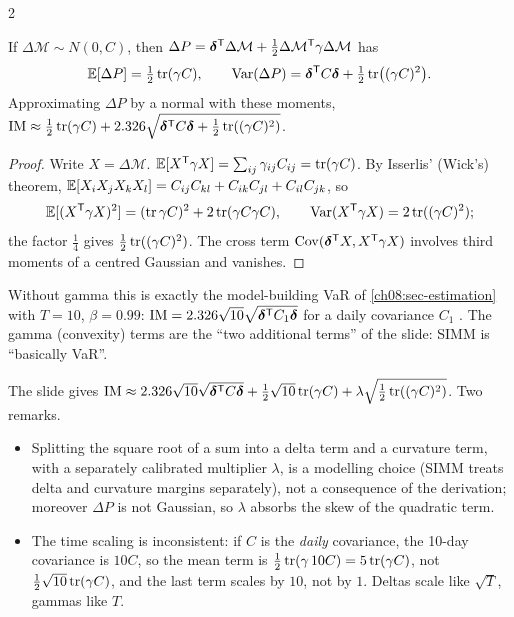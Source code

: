 \begin{paracol}{2}
\begin{proposition}\label{ch08:prop-simm}
If $\Delta\mathcal M\sim N(0,C)$, then $\Delta P=\bm\delta^{\mathsf T}\Delta\mathcal M+\frac12\Delta\mathcal M^{\mathsf T}\gamma\Delta\mathcal M$ has
\[
  \mathbb{E}[\Delta P]=\tfrac12\operatorname{tr}(\gamma C),\qquad \operatorname{Var}(\Delta P)=\bm\delta^{\mathsf T} C\bm\delta+\tfrac12\operatorname{tr}\bigl((\gamma C)^2\bigr).
\]
Approximating $\Delta P$ by a normal with these moments,
$\mathrm{IM}\approx\frac12\operatorname{tr}(\gamma C)+2.326\sqrt{\bm\delta^{\mathsf T} C\bm\delta+\frac12\operatorname{tr}((\gamma C)^2)}$.
\end{proposition}
\begin{proof}
Write $X=\Delta\mathcal M$. $\mathbb{E}[X^{\mathsf T}\gamma X]=\sum_{ij}\gamma_{ij}C_{ij}=\operatorname{tr}(\gamma C)$. By Isserlis' (Wick's) theorem,
$\mathbb{E}[X_iX_jX_kX_l]=C_{ij}C_{kl}+C_{ik}C_{jl}+C_{il}C_{jk}$, so
\[\mathbb{E}[(X^{\mathsf T}\gamma X)^2]=(\operatorname{tr}\gamma C)^2+2\operatorname{tr}(\gamma C\gamma C),\qquad \operatorname{Var}(X^{\mathsf T}\gamma X)=2\operatorname{tr}((\gamma C)^2);\]
the factor
$\frac14$ gives $\frac12\operatorname{tr}((\gamma C)^2)$. The cross term $\operatorname{Cov}(\bm\delta^{\mathsf T} X,X^{\mathsf T}\gamma X)$ involves third moments of a
centred Gaussian and vanishes.
\end{proof}
Without gamma this is exactly the model-building VaR of \cref{ch08:sec-estimation} with $T=10$, $\beta=0.99$:
$\mathrm{IM}=2.326\sqrt{10}\sqrt{\bm\delta^{\mathsf T} C_1\bm\delta}$ for a daily covariance $C_1$ . The
gamma (convexity) terms are the ``two additional terms'' of the slide: SIMM is ``basically VaR''.

\begin{coursenote}
The slide gives $\mathrm{IM}\approx2.326\sqrt{10}\sqrt{\bm\delta^{\mathsf T} C\bm\delta}+\frac12\sqrt{10}\operatorname{tr}(\gamma C)
+\lambda\sqrt{\frac12\operatorname{tr}((\gamma C)^2)}$. Two remarks.
\begin{itemize}
  \item Splitting the square root of a sum into a delta term and a
      curvature term, with a separately calibrated multiplier $\lambda$, is a modelling choice (SIMM treats delta and
      curvature margins separately), not a consequence of the derivation; moreover $\Delta P$ is not Gaussian, so
      $\lambda$ absorbs the skew of the quadratic term.
  \item The time scaling is inconsistent: if $C$ is the \emph{daily}
      covariance, the 10-day covariance is $10C$, so the mean term is $\frac12\operatorname{tr}(\gamma\,10C)=5\operatorname{tr}(\gamma C)$, not
      $\frac12\sqrt{10}\operatorname{tr}(\gamma C)$, and the last term scales by $10$, not by $1$. Deltas scale like $\sqrt T$, gammas
      like $T$.
\end{itemize}
\end{coursenote}


\end{paracol}
